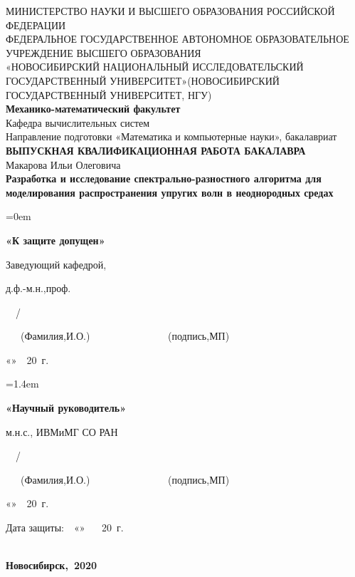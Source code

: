 \begin{singlespacing} %
\thispagestyle{empty} %
\begin{center}
\normalsize{МИНИСТЕРСТВО НАУКИ И ВЫСШЕГО ОБРАЗОВАНИЯ РОССИЙСКОЙ ФЕДЕРАЦИИ}\\
\hfill \break
\normalsize{ФЕДЕРАЛЬНОЕ ГОСУДАРСТВЕННОЕ АВТОНОМНОЕ ОБРАЗОВАТЕЛЬНОЕ УЧРЕЖДЕНИЕ ВЫСШЕГО ОБРАЗОВАНИЯ}\\
\normalsize{«НОВОСИБИРСКИЙ НАЦИОНАЛЬНЫЙ ИССЛЕДОВАТЕЛЬСКИЙ ГОСУДАРСТВЕННЫЙ УНИВЕРСИТЕТ»(НОВОСИБИРСКИЙ ГОСУДАРСТВЕННЫЙ УНИВЕРСИТЕТ, НГУ)}\\
\hfill \break
\large{\textbf{Механико-математический факультет}}\\
\large{Кафедра вычислительных систем}\\
\large{Направление подготовки «Математика и компьютерные науки», бакалавриат}\\
\hfill\break
\normalsize{\textbf{ВЫПУСКНАЯ КВАЛИФИКАЦИОННАЯ РАБОТА БАКАЛАВРА}}\\
\hfill \break
\large{Макарова Ильи Олеговича}\\
\hfill \break
\large{\textbf{Разработка и исследование спектрально-разностного алгоритма для
моделирования распространения упругих волн в неоднородных средах}}\\
\end{center}
\end{singlespacing}

\noindent
\begin{minipage}[t]{80mm}\parindent=0em
\large{\textbf{«К защите допущен»}\par
Заведующий кафедрой,\par
д.ф.-м.н.,проф.\par
{}\ \ / \ \ \makebox[3cm]{\hrulefill}\par}
\small{\ \ ~(Фамилия,И.О.)~\ \ \ \ \ \ \ \ \ \ \ \ ~ ~(подпись,МП)}\par
\large{«\makebox[1cm]{\hrulefill}»\ \makebox[3cm]{\hrulefill}\ 20\makebox[1cm]{\hrulefill}\ г.}
\end{minipage}
\hfill
\begin{minipage}[t]{80mm}\parindent=1.4em
\large{\textbf{«Научный руководитель»}\par
м.н.с., ИВМиМГ СО РАН\par
{}\ \ / \ \ \makebox[3cm]{\hrulefill}\par}
\small{\ \ ~(Фамилия,И.О.)~\ \ \ \ \ \ \ \ \ \ \ \ ~ ~(подпись,МП)}\par
\large{«\makebox[1cm]{\hrulefill}»\ \makebox[3cm]{\hrulefill}\ 20\makebox[1cm]{\hrulefill}\ г.}
\end{minipage}
\begin{flushright}
\hfill \break
\large{Дата защиты:\ \ \large{«\makebox[1cm]{\hrulefill}» \ \makebox[3cm]{\hrulefill} \ 20\makebox[1cm]{\hrulefill}\ г.}}
\end{flushright}
\begin{singlespacing}
\begin{center}
\large{\textbf{\\Новосибирск,~2020}}
\end{center} 
\end{singlespacing}
\clearpage